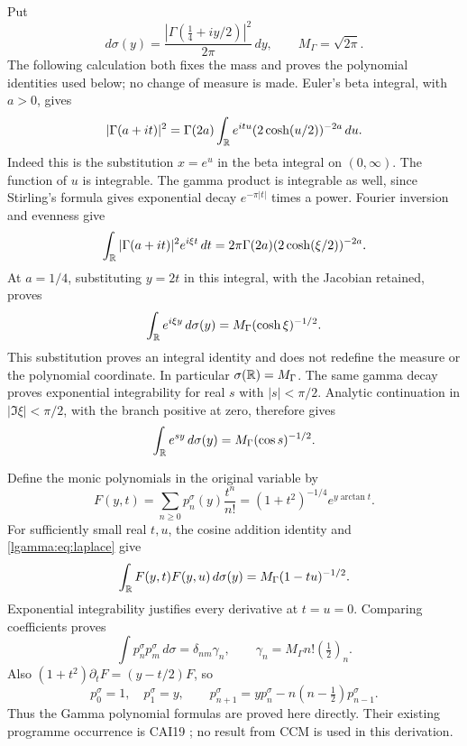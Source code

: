 Put
\begin{equation}\label{lgamma:eq:sigma}
 d\sigma(y)=\frac{|\Gamma(\tfrac14+iy/2)|^2}{2\pi}\,dy,
 \qquad M_\Gamma=\sqrt{2\pi}.
\end{equation}
The following calculation both fixes the mass and proves the polynomial
identities used below; no change of measure is made.
Euler's beta integral, with $a>0$, gives
\[
 |\Gamma(a+it)|^2
 =\Gamma(2a)\int_{\mathbb R}e^{itu}(2\cosh(u/2))^{-2a}\,du.
\]
Indeed this is the substitution $x=e^u$ in the beta integral on
$(0,\infty)$.  The function of $u$ is integrable.  The gamma product is
integrable as well, since Stirling's formula gives exponential decay
$e^{-\pi|t|}$ times a power.  Fourier inversion and evenness give
\[
 \int_{\mathbb R}|\Gamma(a+it)|^2e^{i\xi t}\,dt
 =2\pi\Gamma(2a)(2\cosh(\xi/2))^{-2a}.
\]
At $a=1/4$, substituting $y=2t$ in this integral, with the Jacobian
retained, proves
\begin{equation}\label{lgamma:eq:transform}
 \int_{\mathbb R}e^{i\xi y}\,d\sigma(y)
 =M_\Gamma(\cosh\xi)^{-1/2}.
\end{equation}
This substitution proves an integral identity and does not redefine the
measure or the polynomial coordinate.  In particular
$\sigma(\mathbb R)=M_\Gamma$.  The same gamma decay proves exponential
integrability for real $s$ with $|s|<\pi/2$.  Analytic continuation in
$|\Im\xi|<\pi/2$, with the branch positive at zero, therefore gives
\begin{equation}\label{lgamma:eq:laplace}
 \int_{\mathbb R}e^{sy}\,d\sigma(y)=M_\Gamma(\cos s)^{-1/2}.
\end{equation}

Define the monic polynomials in the original variable by
\begin{equation}\label{lgamma:eq:gen}
 F(y,t)=\sum_{n\ge0}p_n^\sigma(y)\frac{t^n}{n!}
 =(1+t^2)^{-1/4}e^{y\arctan t}.
\end{equation}
For sufficiently small real $t,u$, the cosine addition identity and
\eqref{lgamma:eq:laplace} give
\[
 \int_{\mathbb R}F(y,t)F(y,u)\,d\sigma(y)=M_\Gamma(1-tu)^{-1/2}.
\]
Exponential integrability justifies every derivative at $t=u=0$.
Comparing coefficients proves
\begin{equation}\label{lgamma:eq:norms}
 \int p_n^\sigma p_m^\sigma\,d\sigma
 =\delta_{nm}\gamma_n,
 \qquad \gamma_n=M_\Gamma n!(\tfrac12)_n.
\end{equation}
Also $(1+t^2)\partial_tF=(y-t/2)F$, so
\begin{equation}\label{lgamma:eq:monicrec}
 p_0^\sigma=1,\quad p_1^\sigma=y,\qquad
 p_{n+1}^\sigma=yp_n^\sigma-n(n-\tfrac12)p_{n-1}^\sigma.
\end{equation}
Thus the Gamma polynomial formulas are proved here directly.  Their
existing programme occurrence is CAI19 \cite{lgamma:CAI}; no result from CCM
is used in this derivation.

